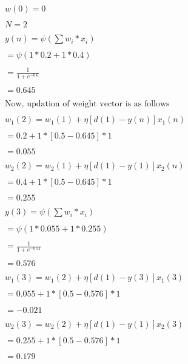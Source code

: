 \documentclass[12pt]{article}
\begin{document}
\begin{gather*}
    w(0)=0\\\\
    N = 2\\\\
    y(n) = \psi({\sum{w_i*x_i}})\\\\
    =\psi({1*0.2+1*0.4})\\\\
    = \frac{1}{1+e^{-0.6}}\\\\
    =0.645\\\\
    \text{Now, updation of weight vector is as follows}\\\\
    w_1(2) = w_1(1) + \eta[d(1)-y(n)]x_1(n)\\\\
    = 0.2 + 1 * [0.5 - 0.645]*1\\\\
    =0.055\\\\
    w_2(2) = w_2(1) + \eta[d(1)-y(1)]x_2(n)\\\\
    = 0.4 + 1 * [0.5-0.645] * 1\\\\
    = 0.255\\\\
    y(3) = \psi({\sum{w_i*x_i}})\\\\
    =\psi({1*0.055+1*0.255})\\\\
    = \frac{1}{1+e^{-0.31}}\\\\
    =0.576\\\\
    w_1(3) = w_1(2) + \eta[d(1)-y(3)]x_1(3)\\\\
    = 0.055 + 1 * [0.5 - 0.576]*1\\\\
    =-0.021\\\\
    w_2(3) = w_2(2) + \eta[d(1)-y(1)]x_2(3)\\\\
    = 0.255 + 1 * [0.5-0.576] * 1\\\\
    = 0.179
\end{gather*}
\end{document}
